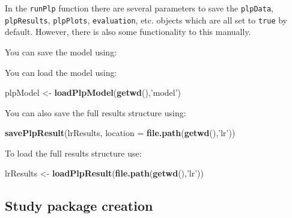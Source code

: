 \documentclass[]{book}
\newenvironment{Shaded}{\begin{snugshade}}{\end{snugshade}}
\newcommand{\KeywordTok}[1]{\textcolor[rgb]{0.13,0.29,0.53}{\textbf{#1}}}
\newcommand{\DataTypeTok}[1]{\textcolor[rgb]{0.13,0.29,0.53}{#1}}
\newcommand{\StringTok}[1]{\textcolor[rgb]{0.31,0.60,0.02}{#1}}
\newcommand{\OperatorTok}[1]{\textcolor[rgb]{0.81,0.36,0.00}{\textbf{#1}}}
\newcommand{\NormalTok}[1]{#1}
\begin{document}
In the \texttt{runPlp} function there are several parameters to save the
\texttt{plpData}, \texttt{plpResults}, \texttt{plpPlots},
\texttt{evaluation}, etc. objects which are all set to \texttt{true} by
default. However, there is also some functionality to this manually.

You can save the model using:

\begin{Shaded}
\end{Shaded}

You can load the model using:

\begin{Shaded}
\begin{Highlighting}[]
\NormalTok{plpModel <-}\StringTok{ }\KeywordTok{loadPlpModel}\NormalTok{(}\KeywordTok{getwd}\NormalTok{(),}\StringTok{'model'}\NormalTok{)}
\end{Highlighting}
\end{Shaded}

You can also save the full results structure using:

\begin{Shaded}
\begin{Highlighting}[]
\KeywordTok{savePlpResult}\NormalTok{(lrResults, }\DataTypeTok{location =} \KeywordTok{file.path}\NormalTok{(}\KeywordTok{getwd}\NormalTok{(),}\StringTok{'lr'}\NormalTok{))}
\end{Highlighting}
\end{Shaded}

To load the full results structure use:

\begin{Shaded}
\begin{Highlighting}[]
\NormalTok{lrResults <-}\StringTok{ }\KeywordTok{loadPlpResult}\NormalTok{(}\KeywordTok{file.path}\NormalTok{(}\KeywordTok{getwd}\NormalTok{(),}\StringTok{'lr'}\NormalTok{))}
\end{Highlighting}
\end{Shaded}

\newpage

\subsection{Study package creation}\label{study-package-creation}
\end{document}
